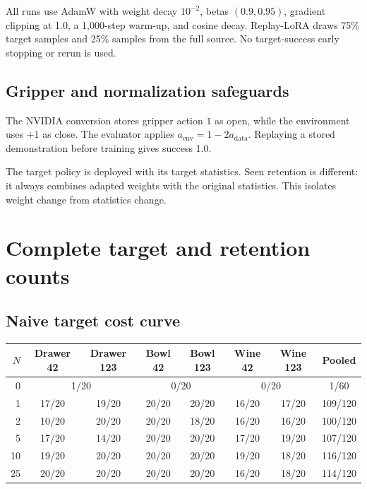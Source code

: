 \documentclass[9pt]{extarticle}
\newcommand{\code}[1]{\texttt{\detokenize{#1}}}
\begin{document}
All runs use AdamW with weight decay \(10^{-2}\), betas \((0.9,0.95)\),
gradient clipping at 1.0, a 1,000-step warm-up, and cosine decay.
Replay-LoRA draws 75\% target samples and 25\% samples from the full
\code{libero_90} source. No target-success early stopping or rerun is used.

\subsection{Gripper and normalization safeguards}

The NVIDIA conversion stores gripper action \(1\) as open, while the environment
uses \(+1\) as close. The evaluator applies
\(a_{\mathrm{env}}=1-2a_{\mathrm{data}}\). Replaying a stored demonstration
before training gives success 1.0.

The target policy is deployed with its target statistics. Seen retention is
different: it always combines adapted weights with the original
\code{libero_90} statistics. This isolates weight change from statistics change.

\clearpage

\section{Complete target and retention counts}

\subsection{Naive target cost curve}

\begin{center}
\begin{tabular}{@{}rccccccc@{}}
\toprule
\(N\) & Drawer 42 & Drawer 123 & Bowl 42 & Bowl 123 & Wine 42 & Wine 123 & Pooled\\
\midrule
0 & \multicolumn{2}{c}{1/20} & \multicolumn{2}{c}{0/20} & \multicolumn{2}{c}{0/20} & 1/60\\
1 & 17/20 & 19/20 & 20/20 & 20/20 & 16/20 & 17/20 & 109/120\\
2 & 10/20 & 20/20 & 20/20 & 18/20 & 16/20 & 16/20 & 100/120\\
5 & 17/20 & 14/20 & 20/20 & 20/20 & 17/20 & 19/20 & 107/120\\
10 & 19/20 & 20/20 & 20/20 & 20/20 & 19/20 & 18/20 & 116/120\\
25 & 20/20 & 20/20 & 20/20 & 20/20 & 16/20 & 18/20 & 114/120\\
\bottomrule
\end{tabular}
\end{center}
\end{document}
